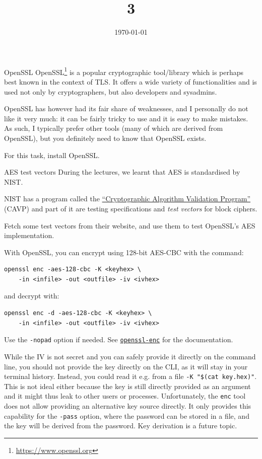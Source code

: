 \documentclass{practice}
\title{3}
\date{\today}
\begin{document}
\maketitle

\begin{task}{OpenSSL}
  OpenSSL\footnote{\url{https://www.openssl.org}} is a popular cryptographic tool/library which is perhaps best known in the context of TLS.
  It offers a wide variety of functionalities and is used not only by cryptographers, but also developers and sysadmins.

  OpenSSL has however had its fair share of weaknesses, and I personally do not like it very much: it can be fairly tricky to use and it is easy to make mistakes.
  As such, I typically prefer other tools (many of which are derived from OpenSSL), but you definitely need to know that OpenSSL exists.

  For this task, install OpenSSL.
\end{task}

\begin{task}{AES test vectors}
  During the lectures, we learnt that AES is standardised by NIST.

  NIST has a program called the \href{https://csrc.nist.gov/projects/cryptographic-algorithm-validation-program/block-ciphers}{\enquote{Cryptographic Algorithm Validation Program}} (CAVP) and part of it are testing specifications and \emph{test vectors} for block ciphers.

  Fetch some test vectors from their website, and use them to test OpenSSL's AES implementation.

  With OpenSSL, you can encrypt using 128-bit AES-CBC with the command:
\begin{verbatim}
openssl enc -aes-128-cbc -K <keyhex> \
    -in <infile> -out <outfile> -iv <ivhex>
\end{verbatim}
  and decrypt with:
\begin{verbatim}
openssl enc -d -aes-128-cbc -K <keyhex> \
    -in <infile> -out <outfile> -iv <ivhex>
\end{verbatim}

  Use the \texttt{-nopad} option if needed.
  See \href{https://docs.openssl.org/master/man1/openssl-enc/}{\texttt{openssl-enc}} for the documentation.

  \begin{tcolorbox}[title=Warning]
    While the IV is not secret and you can safely provide it directly on the command line, you should not provide the key directly on the CLI, as it will stay in your terminal history.
    Instead, you could read it e.g. from a file \texttt{-K "\$(cat key.hex)"}.
    \tcblower
    This is not ideal either because the key is still directly provided as an argument and it might thus leak to other users or processes.
    Unfortunately, the \texttt{enc} tool does not allow providing an alternative key source directly.
    It only provides this capability for the \texttt{-pass} option, where the password can be stored in a file, and the key will be derived from the password.
    Key derivation is a future topic.
  \end{tcolorbox}
\end{task}
\end{document}
